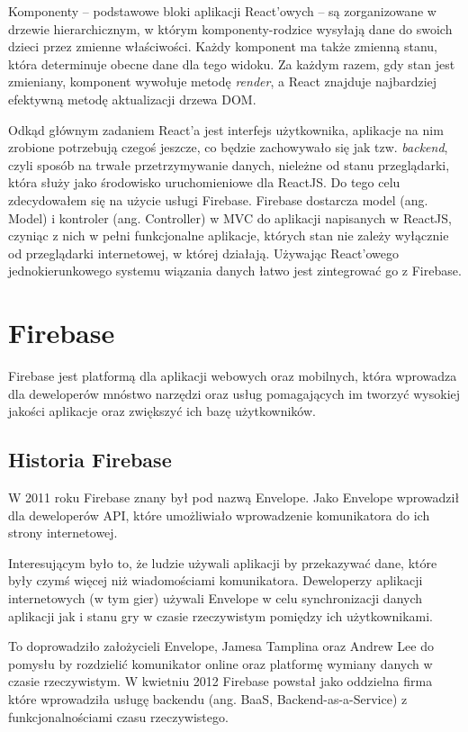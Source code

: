Komponenty – podstawowe bloki aplikacji React'owych – są zorganizowane w drzewie hierarchicznym,
w którym komponenty-rodzice wysyłają dane do swoich dzieci przez zmienne właściwości.
Każdy komponent ma także zmienną stanu, która determinuje obecne dane dla tego widoku.
Za każdym razem, gdy stan jest zmieniany, komponent wywołuje metodę \textit{render},
a React znajduje najbardziej efektywną metodę aktualizacji drzewa DOM.

Odkąd głównym zadaniem React’a jest interfejs użytkownika,
aplikacje na nim zrobione potrzebują czegoś jeszcze,
co będzie zachowywało się jak tzw. \textit{backend}, czyli sposób na trwałe
przetrzymywanie danych, nieleżne od stanu przeglądarki, która służy jako
środowisko uruchomieniowe dla ReactJS.
Do tego celu zdecydowałem się na użycie usługi Firebase.
Firebase dostarcza model (ang. Model) i kontroler (ang. Controller) w MVC
do aplikacji napisanych w ReactJS, czyniąc z nich w pełni funkcjonalne aplikacje,
których stan nie zależy wyłącznie od przeglądarki internetowej, w której działają.
Używając React’owego jednokierunkowego systemu wiązania danych łatwo jest zintegrować go z Firebase.
\cite{www_react}

\section{Firebase}

Firebase jest platformą dla aplikacji webowych oraz mobilnych, która wprowadza
dla deweloperów mnóstwo narzędzi oraz usług pomagających im tworzyć wysokiej jakości
aplikacje oraz zwiększyć ich bazę użytkowników.

\subsection{Historia Firebase}

W 2011 roku Firebase znany był pod nazwą Envelope.
Jako Envelope wprowadził dla deweloperów API,
które umożliwiało wprowadzenie komunikatora do ich strony internetowej.

Interesującym było to, że ludzie używali aplikacji by przekazywać dane,
które były czymś więcej niż wiadomościami komunikatora.
Deweloperzy aplikacji internetowych (w tym gier) używali Envelope
w celu synchronizacji danych aplikacji jak i stanu gry
w czasie rzeczywistym pomiędzy ich użytkownikami.

To doprowadziło założycieli Envelope, Jamesa Tamplina oraz Andrew Lee
do pomysłu by rozdzielić komunikator online oraz platformę wymiany danych w czasie rzeczywistym.
W kwietniu 2012 Firebase powstał jako oddzielna firma które wprowadziła usługę backendu
(ang. BaaS, Backend-as-a-Service) z funkcjonalnościami czasu rzeczywistego.


